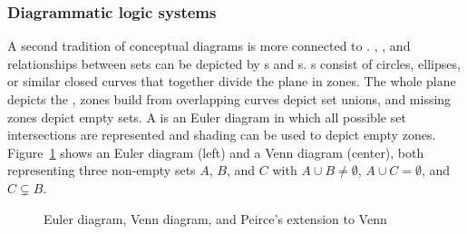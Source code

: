 \subsubsection{Diagrammatic logic systems}

A second tradition of conceptual diagrams is more connected to . , ,
and  relationships between sets can be depicted by s and s. s \cite{Euler1768}
consist of circles, ellipses, or similar closed curves that together divide the
plane in zones. The whole plane depicts the , zones build
from overlapping curves depict set unions, and missing zones depict empty sets.
A  \cite{Venn1880} is an Euler diagram in which all possible
set intersections are represented and shading can be used to depict empty
zones.  Figure~\ref{fig:eulerandvenn} shows an Euler diagram (left) and a Venn
diagram (center), both representing three non-empty sets $A$, $B$, and $C$ with
$A\cup B \neq \emptyset$, $A \cup C = \emptyset$, and $C \subsetneq B$.

\begin{figure}
\centering
{}
\caption{Euler diagram, Venn diagram, and Peirce's extension to Venn}
\label{fig:eulerandvenn}
\end{figure}

